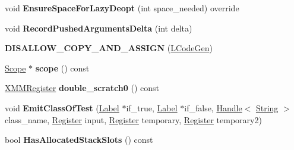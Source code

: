 \begin{DoxyCompactItemize}
\item 
void {\bfseries Ensure\+Space\+For\+Lazy\+Deopt} (int space\+\_\+needed) override\hypertarget{classv8_1_1internal_1_1_l_code_gen_aef92ad7e2537ea5ecfdd73252a97eb48}{}\label{classv8_1_1internal_1_1_l_code_gen_aef92ad7e2537ea5ecfdd73252a97eb48}

\item 
void {\bfseries Record\+Pushed\+Arguments\+Delta} (int delta)\hypertarget{classv8_1_1internal_1_1_l_code_gen_a82ac8d48344b8677ea0dff578c342a44}{}\label{classv8_1_1internal_1_1_l_code_gen_a82ac8d48344b8677ea0dff578c342a44}

\item 
{\bfseries D\+I\+S\+A\+L\+L\+O\+W\+\_\+\+C\+O\+P\+Y\+\_\+\+A\+N\+D\+\_\+\+A\+S\+S\+I\+GN} (\hyperlink{classv8_1_1internal_1_1_l_code_gen}{L\+Code\+Gen})\hypertarget{classv8_1_1internal_1_1_l_code_gen_a475eb7b3d7738263ae865905cf36b985}{}\label{classv8_1_1internal_1_1_l_code_gen_a475eb7b3d7738263ae865905cf36b985}

\item 
\hyperlink{classv8_1_1internal_1_1_scope}{Scope} $\ast$ {\bfseries scope} () const \hypertarget{classv8_1_1internal_1_1_l_code_gen_a2b85c964ccc4e59f50d49d19b0ed5ce0}{}\label{classv8_1_1internal_1_1_l_code_gen_a2b85c964ccc4e59f50d49d19b0ed5ce0}

\item 
\hyperlink{structv8_1_1internal_1_1_double_register}{X\+M\+M\+Register} {\bfseries double\+\_\+scratch0} () const \hypertarget{classv8_1_1internal_1_1_l_code_gen_a0c0eb4edd82abc3bdab18f8720ed44d6}{}\label{classv8_1_1internal_1_1_l_code_gen_a0c0eb4edd82abc3bdab18f8720ed44d6}

\item 
void {\bfseries Emit\+Class\+Of\+Test} (\hyperlink{classv8_1_1internal_1_1_label}{Label} $\ast$if\+\_\+true, \hyperlink{classv8_1_1internal_1_1_label}{Label} $\ast$if\+\_\+false, \hyperlink{classv8_1_1internal_1_1_handle}{Handle}$<$ \hyperlink{classv8_1_1internal_1_1_string}{String} $>$ class\+\_\+name, \hyperlink{structv8_1_1internal_1_1_register}{Register} input, \hyperlink{structv8_1_1internal_1_1_register}{Register} temporary, \hyperlink{structv8_1_1internal_1_1_register}{Register} temporary2)\hypertarget{classv8_1_1internal_1_1_l_code_gen_aae86e9c7161b47dc83e86e0ef0402a43}{}\label{classv8_1_1internal_1_1_l_code_gen_aae86e9c7161b47dc83e86e0ef0402a43}

\item 
bool {\bfseries Has\+Allocated\+Stack\+Slots} () const \hypertarget{classv8_1_1internal_1_1_l_code_gen_a6a5091a94d97298722ad3509d6fa41ab}{}\label{classv8_1_1internal_1_1_l_code_gen_a6a5091a94d97298722ad3509d6fa41ab}


\end{DoxyCompactItemize}
